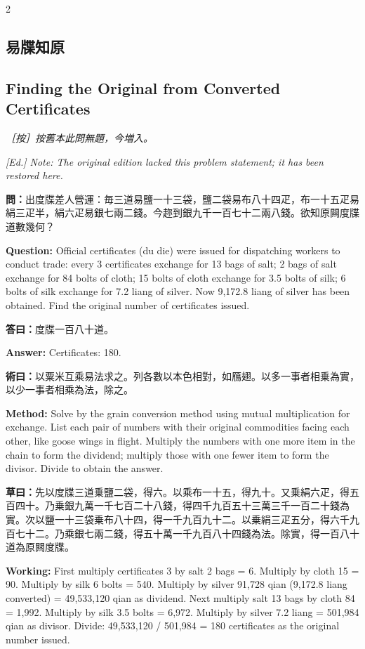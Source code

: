 \documentclass[11pt,a4paper]{article}
\newcommand{\QuestionText}[1]{\par\noindent\textbf{\color{problemcolor}問：}#1\par}
\newcommand{\AnswerText}[1]{\par\noindent\textbf{\color{answercolor}答曰：}#1\par}
\newcommand{\MethodText}[1]{\par\noindent\textbf{\color{methodcolor}術曰：}#1\par}
\newcommand{\WorkingText}[1]{\par\noindent\textbf{草曰：}#1\par}
\newcommand{\EdNoteText}[1]{\par\noindent\textit{\color{ednotecolor}［按］#1}\par}
\newcommand{\QuestionEn}[1]{\par\noindent\textbf{\color{problemcolor}Question:} #1\par}
\newcommand{\AnswerEn}[1]{\par\noindent\textbf{\color{answercolor}Answer:} #1\par}
\newcommand{\MethodEn}[1]{\par\noindent\textbf{\color{methodcolor}Method:} #1\par}
\newcommand{\WorkingEn}[1]{\par\noindent\textbf{Working:} #1\par}
\newcommand{\EdNoteEn}[1]{\par\noindent\textit{\color{ednotecolor}[Ed.] #1}\par}
\begin{document}
\begin{paracol}{2}

\subsection*{\color{sectioncolor}易牒知原}
\switchcolumn
\subsection*{\color{sectioncolor}Finding the Original from Converted Certificates}
\switchcolumn*

\EdNoteText{按舊本此問無題，今増入。}
\switchcolumn
\EdNoteEn{Note: The original edition lacked this problem statement; it has been restored here.}
\switchcolumn*

\QuestionText{出度牒差人營運：毎三道易鹽一十三袋，鹽二袋易布八十四疋，布一十五疋易絹三疋半，絹六疋易銀七兩二錢。今趂到銀九千一百七十二兩八錢。欲知原闗度牒道數幾何？}
\switchcolumn
\QuestionEn{Official certificates (du die) were issued for dispatching workers to conduct trade: every 3 certificates exchange for 13 bags of salt; 2 bags of salt exchange for 84 bolts of cloth; 15 bolts of cloth exchange for 3.5 bolts of silk; 6 bolts of silk exchange for 7.2 liang of silver. Now 9,172.8 liang of silver has been obtained. Find the original number of certificates issued.}
\switchcolumn*

\AnswerText{度牒一百八十道。}
\switchcolumn
\AnswerEn{Certificates: 180.}
\switchcolumn*

\MethodText{以粟米互乘易法求之。列各數以本色相對，如鴈翅。以多一事者相乗為實，以少一事者相乘為法，除之。}
\switchcolumn
\MethodEn{Solve by the grain conversion method using mutual multiplication for exchange. List each pair of numbers with their original commodities facing each other, like goose wings in flight. Multiply the numbers with one more item in the chain to form the dividend; multiply those with one fewer item to form the divisor. Divide to obtain the answer.}
\switchcolumn*

\WorkingText{先以度牒三道乗鹽二袋，得六。以乘布一十五，得九十。又乗絹六疋，得五百四十。乃乗銀九萬一千七百二十八錢，得四千九百五十三萬三千一百二十錢為實。次以鹽一十三袋乗布八十四，得一千九百九十二。以乗絹三疋五分，得六千九百七十二。乃乘銀七兩二錢，得五十萬一千九百八十四錢為法。除實，得一百八十道為原闗度牒。}
\switchcolumn
\WorkingEn{First multiply certificates 3 by salt 2 bags = 6. Multiply by cloth 15 = 90. Multiply by silk 6 bolts = 540. Multiply by silver 91,728 qian (9,172.8 liang converted) = 49,533,120 qian as dividend. Next multiply salt 13 bags by cloth 84 = 1,992. Multiply by silk 3.5 bolts = 6,972. Multiply by silver 7.2 liang = 501,984 qian as divisor. Divide: 49,533,120 / 501,984 = 180 certificates as the original number issued.}
\switchcolumn*


\end{paracol}
\end{document}
